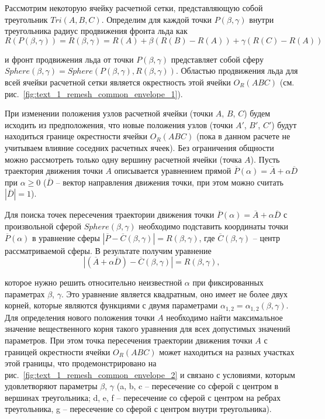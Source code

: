 Рассмотрим некоторую ячейку расчетной сетки, представляющую собой треугольник $Tri(A, B, C)$.
Определим для каждой точки $P(\beta,\gamma)$ внутри треугольника радиус продвижения фронта льда как
\begin{equation}
	R(P(\beta,\gamma)) = R(\beta,\gamma) = R(A) + \beta(R(B) - R(A)) + \gamma(R(C) - R(A))
\end{equation}

и фронт продвижения льда от точки $P(\beta,\gamma)$ представляет собой сферу $Sphere(\beta,\gamma) = Sphere(P(\beta,\gamma),R(\beta,\gamma))$.
Областью продвижения льда для всей ячейки расчетной сетки является окрестность этой ячейки $O_R(ABC)$ (см. рис.~\ref{fig:text_1_remesh_common_envelope_1}).

При изменении положения узлов расчетной ячейки (точки $A$, $B$, $C$) будем исходить из предположения, что новые положения узлов (точки $A'$, $B'$, $C'$) будут находиться границе окрестности ячейки $O_R(ABC)$ (пока в данном расчете не учитываем влияние соседних расчетных ячеек).
Без ограничения общности можно рассмотреть только одну вершину расчетной ячейки (точка $A$).
Пусть траектория движения точки $A$ описывается уравнением прямой $\overline{P}(\alpha) = \overline{A} + \alpha \overline{D}$ при $\alpha \ge 0$ ($\overline{D}$ -- вектор направления движения точки, при этом можно считать $|\overline{D}| = 1$).

Для поиска точек пересечения траектории движения точки $\overline{P}(\alpha) = \overline{A} + \alpha \overline{D}$ с 
произвольной сферой $Sphere(\beta,\gamma)$ необходимо подставить координаты точки $\overline{P}(\alpha)$ в уравнение сферы $|\overline{P} - \overline{C}(\beta,\gamma)| = R(\beta,\gamma)$, где $\overline{C}(\beta,\gamma)$ -- центр рассматриваемой сферы.
В результате получим уравнение
\begin{equation}\label{eqn:text_1_remesh_common_envelope_eq}
	|(\overline{A} + \alpha \overline{D}) - \overline{C}(\beta, \gamma)| = R(\beta, \gamma),
\end{equation}

которое нужно решить относительно неизвестной $\alpha$ при фиксированных параметрах $\beta$, $\gamma$.
Это уравнение является квадратным, оно имеет не более двух корней, которые являются функциями с двумя параметрами $\alpha_{1,2} = \alpha_{1,2}(\beta,\gamma)$.
Для определения нового положения точки $A$ необходимо найти максимальное значение вещественного корня такого уравнения для всех допустимых значений параметров.
При этом точка пересечения траектории движения точки $A$ с границей окрестности ячейки $O_R(ABC)$ может находиться на разных участках этой границы, что продемонстрировано на рис.~\ref{fig:text_1_remesh_common_envelope_2} и связано с условиями, которым удовлетворяют параметры $\beta$, $\gamma$ (a, b, c -- пересечение со сферой с центром в вершинах треугольника; d, e, f -- пересечение со сферой с центром на ребрах треугольника, g -- пересечение со сферой с центром внутри треугольника).

